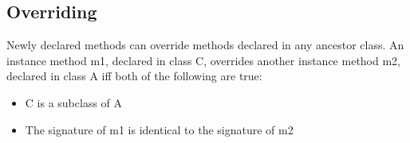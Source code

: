 \begin{homeworkProblem}
	\subsection{Overriding}
	Newly declared methods can override methods declared in any ancestor class. An instance method m1, declared in class C, overrides another instance method m2, declared in class A iff both of the following are true:
	\begin{itemize}
		\item C is a subclass of A
		\item The signature of m1 is identical to the signature of m2
	\end{itemize}
	
\end{homeworkProblem}